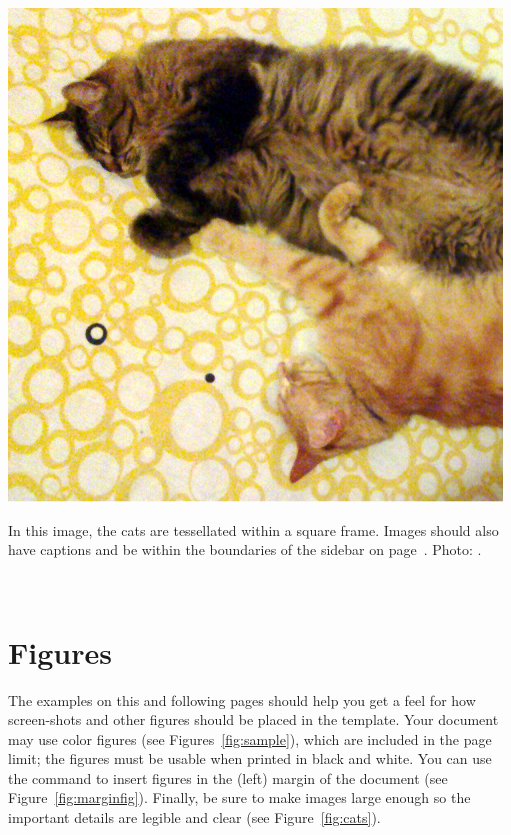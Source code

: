 \documentclass{sigchi-ext}
\begin{document}

\begin{marginfigure}[-45pc]
  \begin{minipage}{\marginparwidth}
    \centering
    \includegraphics[width=0.9\marginparwidth]{figures/cats}
    \caption{In this image, the cats are tessellated within a square
      frame. Images should also have captions and be within the
      boundaries of the sidebar on page~\pageref{sec:sidebar}. Photo:
      \cczero.}~\label{fig:marginfig}
  \end{minipage}
\end{marginfigure}

\section{Figures}
The examples on this and following pages should help you get a feel
for how screen-shots and other figures should be placed in the
template. Your document may use color figures (see
Figures~\ref{fig:sample}), which are included in the page limit; the
figures must be usable when printed in black and white. You can use
the \texttt{\marginpar} command to insert figures in the (left) margin
of the document (see Figure~\ref{fig:marginfig}). Finally, be sure to
make images large enough so the important details are legible and
clear (see Figure~\ref{fig:cats}).
\end{document}
